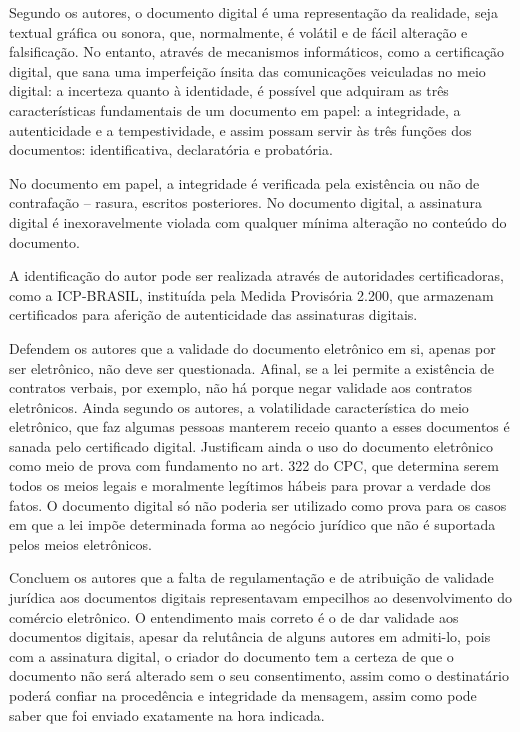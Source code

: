 	Segundo os autores, o documento digital é uma representação da
  realidade, seja textual gráfica ou sonora, que, normalmente, é
  volátil e de fácil alteração e falsificação. No entanto,
  através de mecanismos informáticos, como a certificação
  digital, que sana uma imperfeição ínsita das comunicações
  veiculadas no meio digital: a incerteza quanto à identidade, é
  possível que adquiram as três características fundamentais de
  um documento em papel: a integridade, a autenticidade e a
  tempestividade, e assim possam servir às três funções dos
  documentos: identificativa, declaratória e probatória. \par
	
	No documento em papel, a integridade é verificada pela
  existência ou não de contrafação – rasura, escritos
  posteriores. No documento digital, a assinatura digital é
  inexoravelmente violada com qualquer mínima alteração no
  conteúdo do documento.\par
	
	A identificação do autor pode ser realizada através de
  autoridades certificadoras, como a ICP-BRASIL, instituída pela
  Medida Provisória 2.200, que armazenam certificados para
  aferição de autenticidade das assinaturas digitais. \par
	
	Defendem os autores que a validade do documento eletrônico em
  si, apenas por ser eletrônico, não deve ser questionada.
  Afinal, se a lei permite a existência de contratos verbais, por
  exemplo, não há porque negar validade aos contratos
  eletrônicos. Ainda segundo os autores, a volatilidade
  característica do meio eletrônico, que faz algumas pessoas
  manterem receio quanto a esses documentos é sanada pelo
  certificado digital. Justificam ainda o uso do documento
  eletrônico como meio de prova com fundamento no art. 322 do
  CPC, que determina serem todos os meios legais e moralmente
  legítimos hábeis para provar a verdade dos fatos. O documento
  digital só não poderia ser utilizado como prova para os casos
  em que a lei impõe determinada forma ao negócio jurídico que
  não é suportada pelos meios eletrônicos. \par
	
	Concluem os autores que a falta de regulamentação e de
  atribuição de validade jurídica aos documentos digitais
  representavam empecilhos ao desenvolvimento do comércio
  eletrônico. O entendimento mais correto é o de dar validade aos
  documentos digitais, apesar da relutância de alguns autores em
  admiti-lo, pois com a assinatura digital, o criador do
  documento tem a certeza de que o documento não será alterado
  sem o seu consentimento, assim como o destinatário poderá
  confiar na procedência e integridade da mensagem, assim como
  pode saber que foi enviado exatamente na hora indicada. \par
	
